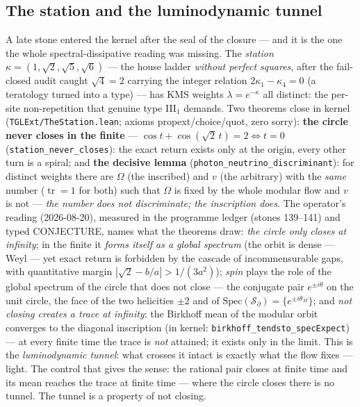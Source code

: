 \documentclass[11pt]{article}
\theoremstyle{definition}\newtheorem{deriv}{Derivation}
\begin{document}
\subsection*{The station and the luminodynamic tunnel}A late stone entered the kernel after the seal of the closure --- and it is the one the whole spectral-dissipative reading was missing. The \emph{station} $\kappa=(1,\sqrt2,\sqrt5,\sqrt6)$ --- the house ladder \emph{without perfect squares}, after the fail-closed audit caught $\sqrt4=2$ carrying the integer relation $2\kappa_1-\kappa_4=0$ (a teratology turned into a type) --- has KMS weights $\lambda=e^{-\kappa}$ all distinct: the per-site non-repetition that genuine type III$_1$ demands. Two theorems close in kernel (\texttt{TGLExt/TheStation.lean}; axioms propext/choice/quot, zero sorry): \textbf{the circle never closes in the finite} --- $\cos t+\cos(\sqrt2\,t)=2\iff t=0$ (\texttt{station\_never\_closes}): the exact return exists only at the origin, every other turn is a spiral; and \textbf{the decisive lemma} (\texttt{photon\_neutrino\_discriminant}): for distinct weights there are $\Omega$ (the inscribed) and $v$ (the arbitrary) with the \emph{same} number ($\operatorname{tr}=1$ for both) such that $\Omega$ is fixed by the whole modular flow and $v$ is not --- \emph{the number does not discriminate; the inscription does}. The operator's reading (2026-08-20), measured in the programme ledger (stones 139--141) and typed \textsf{CONJECTURE}, names what the theorems draw: \emph{the circle only closes at infinity}; in the finite it \emph{forms itself as a global spectrum} (the orbit is dense --- Weyl --- yet exact return is forbidden by the cascade of incommensurable gaps, with quantitative margin $|\sqrt2-b/a|>1/(3a^2)$); \emph{spin} plays the role of the global spectrum of the circle that does not close --- the conjugate pair $e^{\pm i\theta}$ on the unit circle, the face of the two helicities $\pm2$ and of $\mathrm{Spec}(\mathcal S_\partial)=\{e^{\pm i\theta_M}\}$; and \emph{not closing creates a trace at infinity}: the Birkhoff mean of the modular orbit converges to the diagonal inscription (in kernel: \texttt{birkhoff\_tendsto\_specExpect}) --- at every finite time the trace is \emph{not} attained; it exists only in the limit. This is the \emph{luminodynamic tunnel}: what crosses it intact is exactly what the flow fixes --- light. The control that gives the sense: the rational pair closes at finite time and its mean reaches the trace at finite time --- where the circle closes there is no tunnel. The tunnel is a property of not closing.
\end{document}
